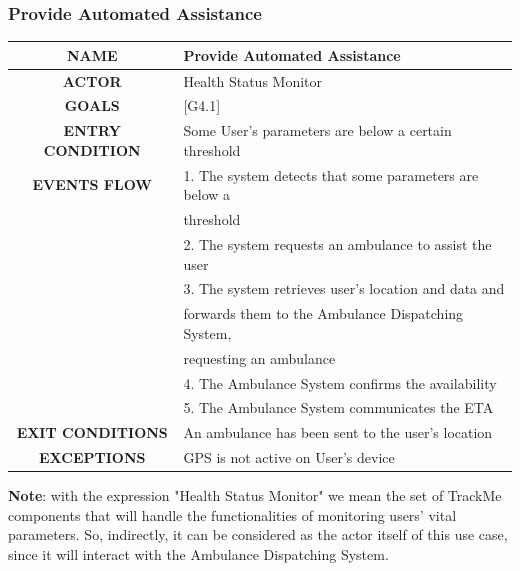 \documentclass[12pt,a4paper]{article}
\begin{document}
		\subsubsection{Provide Automated Assistance}
		\begin{center}
			\begin{tabular}{| c | l |}
				\hline
				\textbf{NAME} & Provide Automated Assistance \\
				\hline
				\textbf{ACTOR} & Health Status Monitor \\
				\hline
				\textbf{GOALS} & [G4.1] \\
				\hline
				\textbf{ENTRY CONDITION} & Some User's parameters are below a certain threshold \\ \hline
				\textbf{EVENTS FLOW}  &
				1. The system detects that some parameters are below a \\
				& threshold\\
				&2. The system requests an ambulance to assist the user\\
				&3. The system retrieves user's location and data and\\
				&forwards them to the Ambulance Dispatching System,\\
				& requesting an ambulance \\
				&4. The Ambulance System confirms the availability\\
				&5. The Ambulance System communicates the ETA\\
				\hline
				\textbf{EXIT CONDITIONS}  & An ambulance has been sent to the user's location \\ \hline
				\textbf{EXCEPTIONS} &
				GPS is not active on User's device\\
				\hline
			\end{tabular}
		\end{center}
		\textbf{Note}: with the expression "Health Status Monitor" we mean the set of TrackMe components that will handle the functionalities of monitoring users' vital parameters. So, indirectly, it can be considered as the actor itself of this use case, since it will interact with the Ambulance Dispatching System.
	
		\newpage
\end{document}
